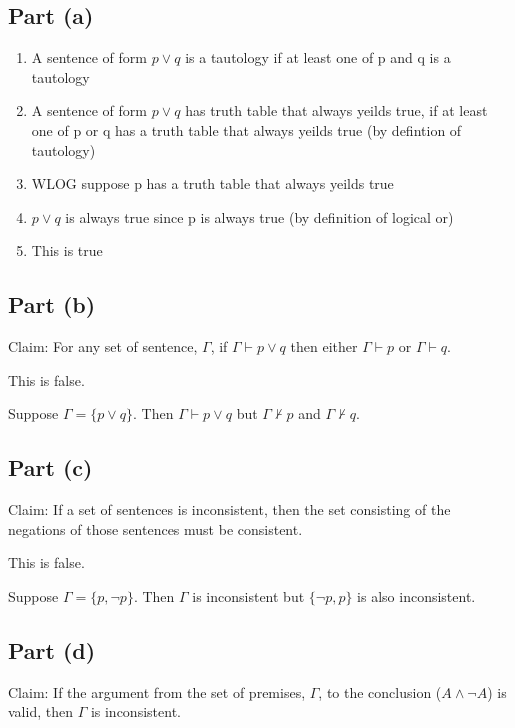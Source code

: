 \documentclass[12pt]{article}
\begin{document}
\subsection*{Part (a)}

\begin{enumerate}
    \item A sentence of form $p \lor q$ is a tautology if at least one of p and q is a tautology
    \item A sentence of form $p \lor q$ has truth table that always yeilds true, if at least one of p or q has a truth table that always yeilds true (by defintion of tautology)
    \item WLOG suppose p has a truth table that always yeilds true
    \item $p \lor q$ is always true since p is always true (by definition of logical or)
    \item This is true
\end{enumerate}

\subsection*{Part (b)}

Claim: For any set of sentence, $\Gamma$, if $\Gamma \vdash p \lor q$ then either $\Gamma \vdash p$ or $\Gamma \vdash q$.

This is false.

Suppose $\Gamma = \{p \lor q\}$. Then $\Gamma \vdash p \lor q$ but $\Gamma \nvdash p$ and $\Gamma \nvdash q$.


\subsection*{Part (c)}

Claim: If a set of sentences is inconsistent, then the set consisting of the negations of those sentences must be consistent. 

This is false.

Suppose $\Gamma = \{p, \lnot p\}$. Then $\Gamma$ is inconsistent but $\{\lnot p, p\}$ is also inconsistent.


\subsection*{Part (d)}

Claim: If the argument from the set of premises, $\Gamma$, to the conclusion ($A \land \lnot A$) is valid, then $\Gamma$ is inconsistent. 
\end{document}
